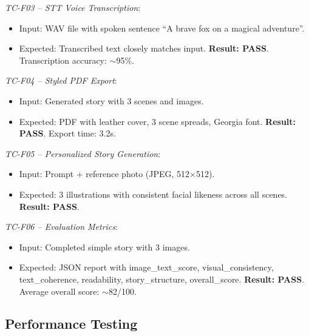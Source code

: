 \textit{TC-F03 -- STT Voice Transcription}:
\begin{itemize}
    \item Input: WAV file with spoken sentence ``A brave fox on a magical adventure''.
    \item Expected: Transcribed text closely matches input. \textbf{Result: PASS}. Transcription accuracy: $\sim$95\%.
\end{itemize}

\textit{TC-F04 -- Styled PDF Export}:
\begin{itemize}
    \item Input: Generated story with 3 scenes and images.
    \item Expected: PDF with leather cover, 3 scene spreads, Georgia font. \textbf{Result: PASS}. Export time: 3.2s.
\end{itemize}

\textit{TC-F05 -- Personalized Story Generation}:
\begin{itemize}
    \item Input: Prompt + reference photo (JPEG, 512$\times$512).
    \item Expected: 3 illustrations with consistent facial likeness across all scenes. \textbf{Result: PASS}.
\end{itemize}

\textit{TC-F06 -- Evaluation Metrics}:
\begin{itemize}
    \item Input: Completed simple story with 3 images.
    \item Expected: JSON report with image\_text\_score, visual\_consistency, text\_coherence, readability, story\_structure, overall\_score. \textbf{Result: PASS}. Average overall score: $\sim$82/100.
\end{itemize}


\subsection{Performance Testing}

